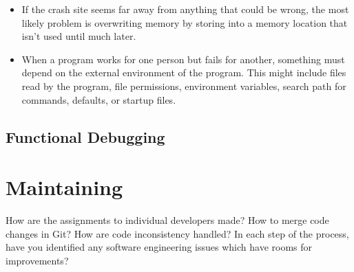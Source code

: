 \documentclass[draftclsnofoot,journal,onecolumn,12pt]{IEEEtran}
\begin{document}
\begin{enumerate}
\begin{itemize}
        \item If the crash site seems far away from anything that could be wrong, the most likely problem is overwriting memory by storing into a memory location that isn't used until much later.
        \item When a program works for one person but fails for another, something must depend on the external environment of the program. This might include files read by the program, file permissions, environment variables, search path for commands, defaults, or startup files.
      \end{itemize}
\end{enumerate}

\subsection{Functional Debugging}

\section{Maintaining}

How are the assignments to individual developers made? How to merge code changes in Git? How are code inconsistency handled? In each step of the process, have you identified any software engineering issues which have rooms for improvements?
\end{document}
